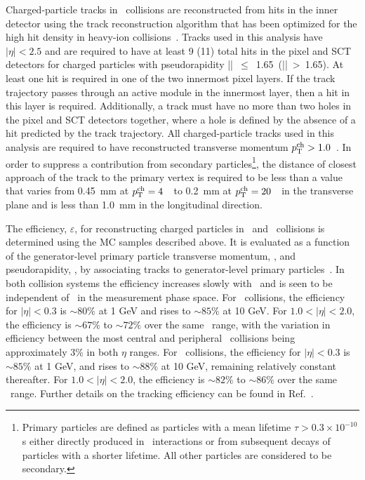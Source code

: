 Charged-particle tracks in \pbpb\ collisions are reconstructed from hits in the inner detector using the track reconstruction algorithm that has been optimized for the high hit density in heavy-ion collisions~\cite{Aaboud:2017all}.
Tracks used in this analysis have $|\eta| < 2.5$ and are required to have at least 9 (11) total hits in the pixel and SCT detectors for charged particles with pseudorapidity \mbox{|\etatrk| $\leq$ 1.65 (|\etatrk| > 1.65)}.
At least one hit is required in one of the two innermost pixel layers.
If the track trajectory passes through an active module in the innermost layer, then a hit in this layer is required.
Additionally, a track must have no more than two holes in the pixel and SCT detectors together, where a hole is defined by the absence of a hit predicted by the track trajectory.
All charged-particle tracks used in this analysis are required to have reconstructed transverse momentum $\mbox{$p_{\mathrm{T}}^{\mathrm{ch}}$} > 1.0 $~\GeV.
In order to suppress a contribution from secondary particles\footnote{Primary particles are defined as particles with a mean lifetime $\tau>0.3\times 10^{-10}$ s either directly produced in \pp\ interactions or from subsequent decays of particles with a shorter lifetime.
All other particles are considered to be secondary.}, the distance of closest approach of the track to the primary vertex is required to be less than a value that varies from 0.45~mm at $\mbox{$p_{\mathrm{T}}^{\mathrm{ch}}$}=4$~\GeV\ to 0.2~mm at $\mbox{$p_{\mathrm{T}}^{\mathrm{ch}}$}=20$~\GeV\ in the transverse plane and is less than 1.0~mm in the longitudinal direction.


The efficiency, $\varepsilon$, for reconstructing charged particles in \PbPb\ and \pp\ collisions is determined using the MC samples described above.
It is evaluated as a function of the generator-level primary particle transverse momentum, \pTtrue, and pseudorapidity, \etatrue, by associating tracks to generator-level primary particles~\cite{Aad:2010ah}.
In both collision systems the efficiency increases slowly with \pTtrue\ and is seen to be independent of \ptjet\ in the measurement phase space.
For \pbpb\ collisions, the efficiency for $|\eta| < 0.3$  is $\sim 80\%$ at 1 GeV and rises to $\sim 85\%$ at 10 GeV.
For $1.0 < |\eta| < 2.0$, the efficiency is $\sim 67\%$ to $\sim 72\%$  over the same \pt\ range, with the variation in efficiency between the most central and peripheral \pbpb\ collisions being approximately 3\% in both $\eta$ ranges.
For \pp\ collisions, the efficiency for $|\eta| < 0.3$ is $\sim85\%$ at 1 GeV, and rises to $\sim 88 \%$ at 10 GeV, remaining relatively constant thereafter.
For $1.0 < |\eta| < 2.0$, the efficiency is $\sim 82\%$ to $\sim 86\%$ over the same \pt\ range.
Further details on the tracking efficiency can be found in Ref.~\cite{Aaboud:2017bzv}.

